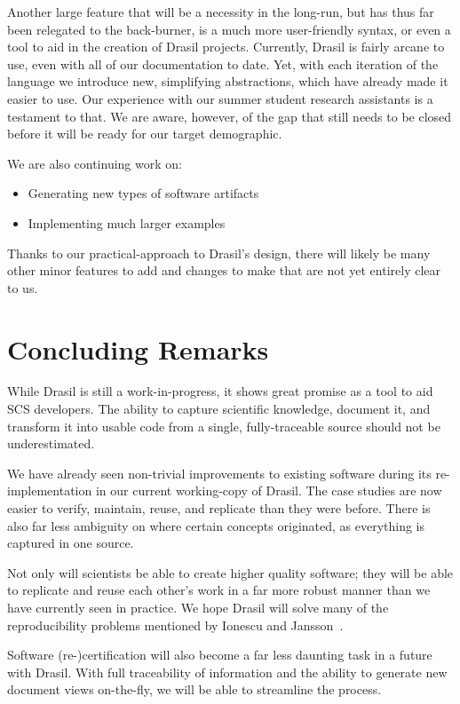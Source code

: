 \documentclass[sigconf]{acmart}
\begin{document}
Another large feature that will be a necessity in the long-run, but has thus 
far been relegated to the back-burner, is a much more user-friendly syntax, or 
even a tool to aid in the creation of Drasil projects. Currently, Drasil is 
fairly arcane to use, even with all of our documentation to date. Yet, with 
each iteration of the language we introduce new, simplifying abstractions, 
which have already made it easier to use. Our experience with our summer student 
research assistants is a testament to that. We are aware, however, of the gap 
that still needs to be closed before it will be ready for our target 
demographic.

We are also continuing work on:
\begin{itemize}
	\item Generating new types of software artifacts
	\item Implementing much larger examples
\end{itemize}

Thanks to our practical-approach to Drasil's design, there will likely be many 
other minor features to add and changes to make that are not yet entirely clear 
to us.

\section{Concluding Remarks}

While Drasil is still a work-in-progress, it shows great promise as a tool to 
aid SCS developers. The ability to capture scientific knowledge, document it, 
and transform it into usable code from a single, fully-traceable source should 
not be underestimated.

We have already seen non-trivial improvements to existing software during its 
re-implementation in our current working-copy of Drasil. The case studies are 
now easier to verify, maintain, reuse, and replicate than they were before. 
There is also far less ambiguity on where certain concepts originated, as 
everything is captured in one source.

Not only will scientists be able to create higher quality software; they will 
be able to replicate and reuse each other's work in a far more robust manner 
than we have currently seen in practice. We hope Drasil will solve many of the 
reproducibility problems mentioned by Ionescu and 
Jansson~\cite{IonescuAndJansson2013}.

Software (re-)certification will also become a far less daunting task in a
future with Drasil. With full traceability of information and the ability to 
generate new document views on-the-fly, we will be able to streamline the 
process.
\end{document}
